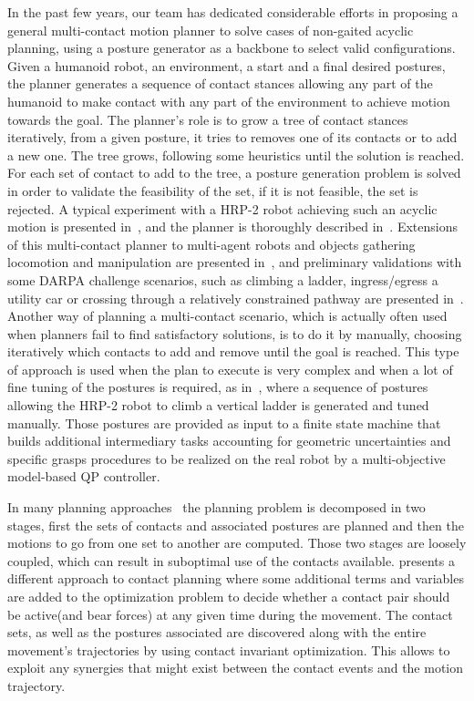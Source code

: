 In the past few years, our team has dedicated considerable efforts in proposing a general multi-contact motion planner to solve cases of non-gaited acyclic planning, using a posture generator as a backbone to select valid configurations.
Given a humanoid robot, an environment, a start and a final desired postures, the planner generates a sequence of contact stances allowing any part of the humanoid to make contact with any part of the environment to achieve motion towards the goal.
The planner's role is to grow a tree of contact stances iteratively, from a given posture, it tries to removes one of its contacts or to add a new one.
The tree grows, following some heuristics until the solution is reached.
For each set of contact to add to the tree, a posture generation problem is solved in order to validate the feasibility of the set, if it is not feasible, the set is rejected.
A typical experiment with a HRP-2 robot achieving such an acyclic motion is presented in~\cite{escande:iser:2008}, and the planner is thoroughly described in~\cite{escande:ras:2013}.
Extensions of this multi-contact planner to multi-agent robots and objects gathering locomotion and manipulation are presented in~\cite{bouyarmane:ar:2012}, and preliminary validations with some DARPA challenge scenarios, such as climbing a ladder, ingress/egress a utility car or crossing through a relatively constrained pathway are presented in~\cite{bouyarmane:humanoids:2012}.
Another way of planning a multi-contact scenario, which is actually often used when planners fail to find satisfactory solutions, is to do it by manually, choosing iteratively which contacts to add and remove until the goal is reached.
This type of approach is used when the plan to execute is very complex and when a lot of fine tuning of the postures is required, as in~\cite{vaillant:autonomousrobots:2016}, where a sequence of postures allowing the HRP-2 robot to climb a vertical ladder is generated and tuned manually.
Those postures are provided as input to a finite state machine that builds additional intermediary tasks accounting for geometric uncertainties and specific grasps procedures to be realized on the real robot by a multi-objective model-based QP controller.

In many planning approaches~\cite{kuffner2005motion, chestnutt2007navigation, hauser:ijrr:2008, kolter2008control, bouyarmane:icra:2011} the planning problem is decomposed in two stages, first the sets of contacts and associated postures are planned and then the motions to go from one set to another are computed.
Those two stages are loosely coupled, which can result in suboptimal use of the contacts available.
\cite{mordatch:acm:2012} presents a different approach to contact planning where some additional terms and variables are added to the optimization problem to decide whether a contact pair should be active(and bear forces) at any given time during the movement.
The contact sets, as well as the postures associated are discovered along with the entire movement's trajectories by using contact invariant optimization.
This allows to exploit any synergies that might exist between the contact events and the motion trajectory.

